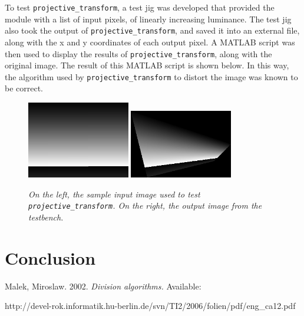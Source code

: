 \documentclass[10pt]{article}
\begin{document}
To test {\tt projective\_transform}, a test jig was developed that provided the module with a list of input pixels, of linearly increasing luminance. The test jig also took the output of {\tt projective\_transform}, and saved it into an external file, along with the x and y coordinates of each output pixel. A MATLAB script was then used to display the results of {\tt projective\_transform}, along with the original image. The result of this MATLAB script is shown below. In this way, the algorithm used by {\tt projective\_transform} to distort the image was known to be correct.

\begin{figure}[h!]
\centering
\includegraphics[width=0.4\textwidth]{images/original.png}
\includegraphics[width=0.4\textwidth]{images/output.png}
\caption{\emph{On the left, the sample input image used to test {\tt projective\_transform}. On the right, the output image from the testbench.}}
\end{figure}

 
\section{Conclusion}

\begin{thebibliography}{9}

  Malek, Miroslaw.
  2002.
  \emph{Division algorithms.}
  Available: \\ \begin{url} http://devel-rok.informatik.hu-berlin.de/svn/TI2/2006/folien/pdf/eng\_ca12.pdf \end{url}

\end{thebibliography}
\end{document}
